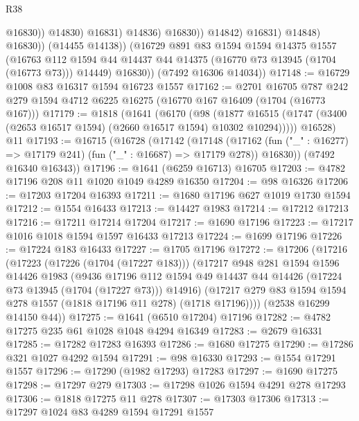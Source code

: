 \begin{lexlean}{R38}
\begin{coremodule}
                                  @16830))
                              @14830)
                            @16831)
                          @14836)
                        @16830))
                    @14842)
                  @16831)
                @14848)
              @16830))
          (@14455 @14138))
        (@16729
          @891
          @83
          @1594
          @1594
          @14375
          @1557
          (@16763 @112 @1594 @44 @14437 @44 @14375 (@16770 @73 @13945 (@1704 (@16773 @73))) @14449)
          @16830))
      (@7492 @16306 @14034))
@17148 := @16729 @1008 @83 @16317 @1594 @16723 @1557
@17162 := @2701
    @16705
    @787
    @242
    @279
    @1594
    @4712
    @6225
    @16275
    (@16770 @167 @16409 (@1704 (@16773 @167)))
@17179 := @1818
    (@1641
      (@6170
        (@98
          (@1877 @16515 (@1747 (@3400 (@2653 @16517 @1594) (@2660 @16517 @1594) @10302 @10294)))))
      @16528)
    @11
@17193 := @16715
    (@16728
      (@17142
        (@17148
          (@17162 (fun ("_" : @16277) => @17179 @241) (fun ("_" : @16687) => @17179 @278))
          @16830))
      (@7492 @16340 @16343))
@17196 := @1641 (@6259 @16713) @16705
@17203 := @4782 @17196 @208 @11 @1020 @1049 @4289 @16350
@17204 := @98 @16326
@17206 := @17203 @17204 @16393
@17211 := @1680 @17196 @627 @1019 @1730 @1594
@17212 := @1554 @16433
@17213 := @14427 @1983
@17214 := @17212 @17213
@17216 := @17211 @17214 @17204
@17217 := @1690 @17196
@17223 := @17217 @1016 @1018 @1594 @1597 @16433 @17213
@17224 := @1699 @17196
@17226 := @17224 @183 @16433
@17227 := @1705 @17196
@17272 := @17206
    (@17216
      (@17223
        (@17226 (@1704 (@17227 @183)))
        (@17217
          @948
          @281
          @1594
          @1596
          @14426
          @1983
          (@9436
            @17196
            @112
            @1594
            @49
            @14437
            @44
            @14426
            (@17224 @73 @13945 (@1704 (@17227 @73)))
            @14916)
          (@17217 @279 @83 @1594 @1594 @278 @1557 (@1818 @17196 @11 @278) (@1718 @17196))))
      (@2538 @16299 @14150 @44))
@17275 := @1641 (@6510 @17204) @17196
@17282 := @4782 @17275 @235 @61 @1028 @1048 @4294 @16349
@17283 := @2679 @16331
@17285 := @17282 @17283 @16393
@17286 := @1680 @17275
@17290 := @17286 @321 @1027 @4292 @1594
@17291 := @98 @16330
@17293 := @1554 @17291 @1557
@17296 := @17290 (@1982 @17293) @17283
@17297 := @1690 @17275
@17298 := @17297 @279
@17303 := @17298 @1026 @1594 @4291 @278 @17293
@17306 := @1818 @17275 @11 @278
@17307 := @17303 @17306
@17313 := @17297 @1024 @83 @4289 @1594 @17291 @1557

\end{coremodule}
\end{lexlean}
